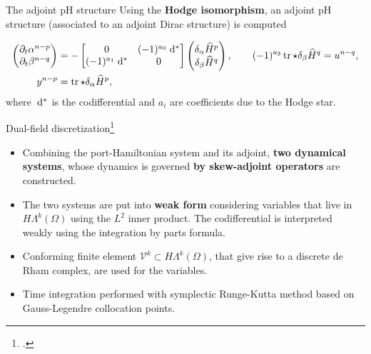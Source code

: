 \documentclass[aspectratio=169]{beamer}
\DeclareMathOperator{\tr}{tr}
\newcommand*{\dual}[1]{\ensuremath{\widehat{#1}}}
\begin{document}
\begin{frame}{The adjoint pH structure}
	Using the \textbf{Hodge isomorphism}, an adjoint pH structure (associated to an adjoint Dirac structure) is computed
	
	\begin{tcolorbox}[nobeforeafter, colframe=theme,title=Adjoint pH system]%
	\begin{equation*}
		\begin{aligned}
			\begin{pmatrix}
				\partial_t {\alpha}^{n-p} \\
				\partial_t {\beta}^{n-q} \\
			\end{pmatrix} &= -
			\begin{bmatrix}
				0 &  (-1)^{a_0}\d{}^* \\
				(-1)^{a_1}\d{}^* & 0 \\
			\end{bmatrix}
			\begin{pmatrix}
				\delta_{\alpha} \dual{H}^p \\
				\delta_{{\beta}} \dual{H}^q
			\end{pmatrix}, \qquad (-1)^{a_3}\tr \star \delta_{{\beta}} \dual{H}^q= u^{n-q}, \\
			y^{n-p} &= \tr \star \delta_{\alpha} \dual{H}^p,
		\end{aligned}
	\end{equation*}
	where $\d{}^{*}$ is the codifferential and $a_i$ are coefficients due to the Hodge star.
	\end{tcolorbox} 

\end{frame}
	
\begin{frame}{Dual-field discretization\footcite{brugnoli2022df}}
	\begin{itemize}
		\item Combining the port-Hamiltonian system and its adjoint, \textbf{two dynamical systems}, whose dynamics is governed \textbf{by skew-adjoint operators} are constructed.
		\item The two systems are put into \textbf{weak form} considering variables that live in $H\Lambda^k(\Omega)$ using the $L^2$ inner product. The codifferential is interpreted weakly using the integration by parts formula.
		\item Conforming finite element $\mathcal{V}^k \subset H\Lambda^k(\Omega)$, that give rise to a discrete de Rham complex, are used for the variables.
		\item Time integration performed with symplectic Runge-Kutta method based on Gauss-Legendre collocation points.
	\end{itemize}
	
\end{frame}
\end{document}
